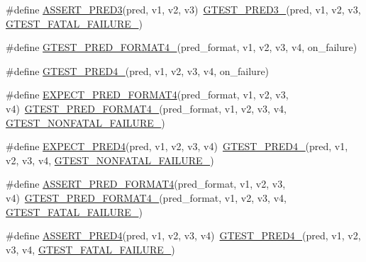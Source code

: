 \begin{DoxyCompactItemize}
\item 
\#define \hyperlink{fused-src_2gtest_2gtest_8h_aa7688f3ab9f09a2c1dbf13bd1f29d8fd}{A\-S\-S\-E\-R\-T\-\_\-\-P\-R\-E\-D3}(pred, v1, v2, v3)~\hyperlink{gtest__pred__impl_8h_af30518f03233bc4486b55284b0827eb8}{G\-T\-E\-S\-T\-\_\-\-P\-R\-E\-D3\-\_\-}(pred, v1, v2, v3, \hyperlink{gtest-internal_8h_a0f9a4c3ea82cc7bf4478eaffdc168358}{G\-T\-E\-S\-T\-\_\-\-F\-A\-T\-A\-L\-\_\-\-F\-A\-I\-L\-U\-R\-E\-\_\-})
\item 
\#define \hyperlink{fused-src_2gtest_2gtest_8h_abd207ed869491ba4bba29f8df37b7355}{G\-T\-E\-S\-T\-\_\-\-P\-R\-E\-D\-\_\-\-F\-O\-R\-M\-A\-T4\-\_\-}(pred\-\_\-format, v1, v2, v3, v4, on\-\_\-failure)
\item 
\#define \hyperlink{fused-src_2gtest_2gtest_8h_a14e8c70455104fac032efec097ef668b}{G\-T\-E\-S\-T\-\_\-\-P\-R\-E\-D4\-\_\-}(pred, v1, v2, v3, v4, on\-\_\-failure)
\item 
\#define \hyperlink{fused-src_2gtest_2gtest_8h_a3354347de0f2445400b509cf39dce1dc}{E\-X\-P\-E\-C\-T\-\_\-\-P\-R\-E\-D\-\_\-\-F\-O\-R\-M\-A\-T4}(pred\-\_\-format, v1, v2, v3, v4)~\hyperlink{gtest__pred__impl_8h_abd207ed869491ba4bba29f8df37b7355}{G\-T\-E\-S\-T\-\_\-\-P\-R\-E\-D\-\_\-\-F\-O\-R\-M\-A\-T4\-\_\-}(pred\-\_\-format, v1, v2, v3, v4, \hyperlink{gtest-internal_8h_a6cb7482cfa03661a91c698eb5895f642}{G\-T\-E\-S\-T\-\_\-\-N\-O\-N\-F\-A\-T\-A\-L\-\_\-\-F\-A\-I\-L\-U\-R\-E\-\_\-})
\item 
\#define \hyperlink{fused-src_2gtest_2gtest_8h_a4fd2b1bad63eb752bc2ff2b6bb3f4569}{E\-X\-P\-E\-C\-T\-\_\-\-P\-R\-E\-D4}(pred, v1, v2, v3, v4)~\hyperlink{gtest__pred__impl_8h_a14e8c70455104fac032efec097ef668b}{G\-T\-E\-S\-T\-\_\-\-P\-R\-E\-D4\-\_\-}(pred, v1, v2, v3, v4, \hyperlink{gtest-internal_8h_a6cb7482cfa03661a91c698eb5895f642}{G\-T\-E\-S\-T\-\_\-\-N\-O\-N\-F\-A\-T\-A\-L\-\_\-\-F\-A\-I\-L\-U\-R\-E\-\_\-})
\item 
\#define \hyperlink{fused-src_2gtest_2gtest_8h_a1842593c1dfb13c9a4b33b01540a8b40}{A\-S\-S\-E\-R\-T\-\_\-\-P\-R\-E\-D\-\_\-\-F\-O\-R\-M\-A\-T4}(pred\-\_\-format, v1, v2, v3, v4)~\hyperlink{gtest__pred__impl_8h_abd207ed869491ba4bba29f8df37b7355}{G\-T\-E\-S\-T\-\_\-\-P\-R\-E\-D\-\_\-\-F\-O\-R\-M\-A\-T4\-\_\-}(pred\-\_\-format, v1, v2, v3, v4, \hyperlink{gtest-internal_8h_a0f9a4c3ea82cc7bf4478eaffdc168358}{G\-T\-E\-S\-T\-\_\-\-F\-A\-T\-A\-L\-\_\-\-F\-A\-I\-L\-U\-R\-E\-\_\-})
\item 
\#define \hyperlink{fused-src_2gtest_2gtest_8h_addc030c521775610e4619a01541a2167}{A\-S\-S\-E\-R\-T\-\_\-\-P\-R\-E\-D4}(pred, v1, v2, v3, v4)~\hyperlink{gtest__pred__impl_8h_a14e8c70455104fac032efec097ef668b}{G\-T\-E\-S\-T\-\_\-\-P\-R\-E\-D4\-\_\-}(pred, v1, v2, v3, v4, \hyperlink{gtest-internal_8h_a0f9a4c3ea82cc7bf4478eaffdc168358}{G\-T\-E\-S\-T\-\_\-\-F\-A\-T\-A\-L\-\_\-\-F\-A\-I\-L\-U\-R\-E\-\_\-})

\end{DoxyCompactItemize}
